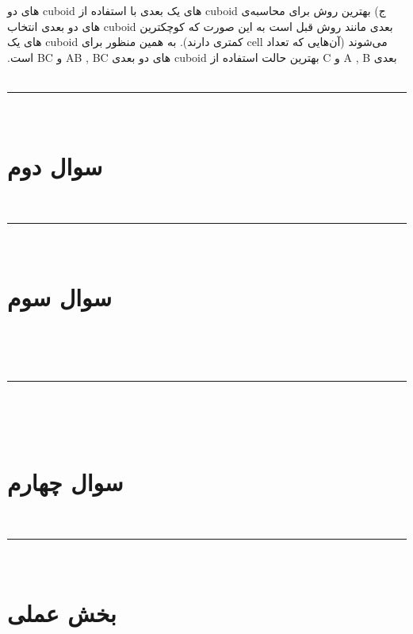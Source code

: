 
‫\vspace{1cm}
‫
‫ج) بهترین روش برای محاسبه‌ی cuboid های یک بعدی با استفاده از cuboid های دو بعدی مانند روش قبل است به این صورت که کوچکترین cuboid های دو بعدی انتخاب می‌شوند (آن‌هایی که تعداد cell کمتری دارند). به همین منظور برای cuboid های یک بعدی A , B و C بهترین حالت استفاده از cuboid های دو بعدی AB , BC و BC است.
‫
‫
‫\vspace{1cm}
‫
‫\hrule height .4 pt depth 0 pt width 16 cm \relax
‫
‫%
‫
‫\section{سوال دوم}
‫
‫
‫\vspace{1cm}
‫
‫\hrule height .4 pt depth 0 pt width 16 cm \relax
‫
‫‫%
‫
‫\section{سوال سوم}
‫

‫\vspace{1cm}
‫
‫\hrule height .4 pt depth 0 pt width 16 cm \relax
‫
‫‫%

‫\section{سوال چهارم}

‫\vspace{1cm}
‫
‫\hrule height .4 pt depth 0 pt width 16 cm \relax
‫
‫‫%
‫
‫‫‫\section*{بخش عملی}
‫
‫